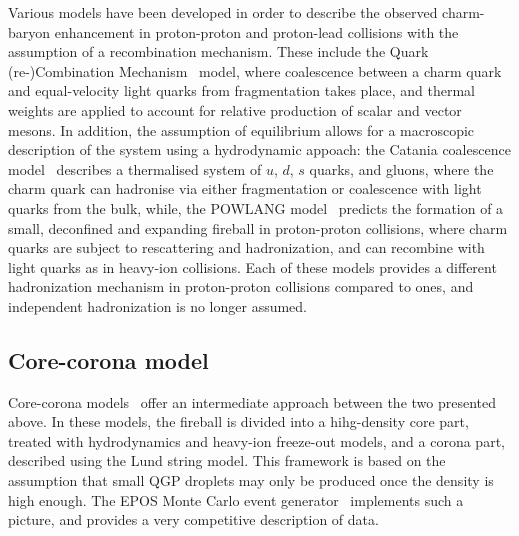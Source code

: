 Various models have been developed in order to describe the observed charm-baryon enhancement in proton-proton and proton-lead collisions with the assumption of a recombination mechanism. These include the Quark (re-)Combination Mechanism~\cite{Song:2018tpv} model, where coalescence between a charm quark and equal-velocity light quarks from fragmentation takes place, and thermal weights are applied to account for relative production of scalar and vector mesons. In addition, the assumption of equilibrium allows for a macroscopic description of the system using a hydrodynamic appoach: the Catania coalescence model~\cite{Minissale:2020bif} describes a thermalised system of $u$, $d$, $s$ quarks, and gluons, where the charm quark can hadronise via either fragmentation or coalescence with light quarks from the bulk, while, the POWLANG model~\cite{Beraudo:2023nlq} predicts the formation of a small, deconfined and expanding fireball in proton-proton collisions, where charm quarks are subject to rescattering and hadronization, and can recombine with light quarks as in heavy-ion collisions. Each of these models provides a different hadronization mechanism in proton-proton collisions compared to \ee ones, and independent hadronization is no longer assumed. 

\subsection{Core-corona model}
Core-corona models~\cite{Werner:2007bf} offer an intermediate approach between the two presented above. In these models, the fireball is divided into a hihg-density core part, treated with hydrodynamics and heavy-ion freeze-out models, and a corona part, described using the Lund string model. This framework is based on the assumption that small QGP droplets may only be produced once the density is high enough. The EPOS Monte Carlo event generator~\cite{Porteboeuf:2008fgf} implements such a picture, and provides a very competitive description of data.


